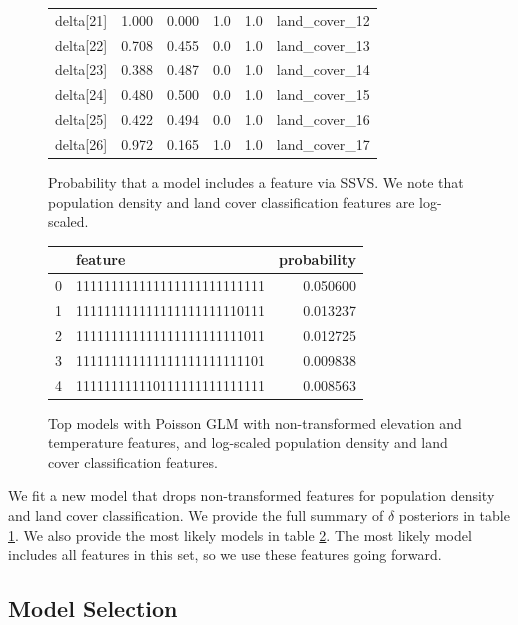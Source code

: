 \documentclass[notitlepage]{article}
\begin{document}
\begin{figure}[H]
\begin{tabular}{lrrrrl}
delta[21] &  1.000 &  0.000 &     1.0 &      1.0 &       land\_cover\_12 \\
delta[22] &  0.708 &  0.455 &     0.0 &      1.0 &       land\_cover\_13 \\
delta[23] &  0.388 &  0.487 &     0.0 &      1.0 &       land\_cover\_14 \\
delta[24] &  0.480 &  0.500 &     0.0 &      1.0 &       land\_cover\_15 \\
delta[25] &  0.422 &  0.494 &     0.0 &      1.0 &       land\_cover\_16 \\
delta[26] &  0.972 &  0.165 &     1.0 &      1.0 &       land\_cover\_17 \\
\bottomrule
\end{tabular}
\caption{Probability that a  model includes a feature via SSVS. We note that population density and land cover classification features are log-scaled.}
\label{table:delta_values}
\end{figure}

\begin{figure}[H]
\centering
\begin{tabular}{llr}
\toprule
{} &                      feature &  probability \\
\midrule
0 &  111111111111111111111111111 &     0.050600 \\
1 &  111111111111111111111110111 &     0.013237 \\
2 &  111111111111111111111111011 &     0.012725 \\
3 &  111111111111111111111111101 &     0.009838 \\
4 &  111111111110111111111111111 &     0.008563 \\
\bottomrule
\end{tabular}
\caption{Top models with Poisson GLM with non-transformed elevation and temperature features, and log-scaled population density and land cover classification features.}
\label{table:svss_model}
\end{figure}

We fit a new model that drops non-transformed features for population density and land cover classification.
We provide the full summary of $\delta$ posteriors in table \ref{table:delta_values}.
We also provide the most likely models in table \ref{table:svss_model}.
The most likely model includes all features in this set, so we use these features going forward.

\subsection{Model Selection}
\label{model_selection}
\end{document}
